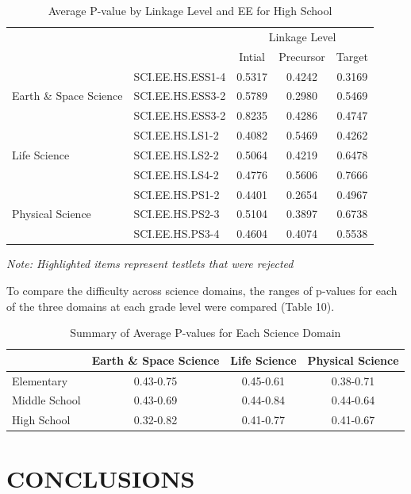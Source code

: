 \documentclass[11.5pt]{sig-alternate} %
\begin{document}
\begin{large}
\begin{table}[thp]
\caption{Average P-value by Linkage Level and EE for High School}
\begin{tabular}{llccc}
\hline
& & \multicolumn{3}{c}{Linkage Level} \\ \cline{3-5}
& & Intial & Precursor & Target \\ \hline
\multirow{3}{*}{Earth \& Space Science} & SCI.EE.HS.ESS1-4 & 0.5317 & 0.4242 & 0.3169 \\
 & SCI.EE.HS.ESS3-2 & 0.5789 & \cellcolor{yellow}0.2980 & 0.5469 \\
 & SCI.EE.HS.ESS3-2 & 0.8235 & 0.4286 & 0.4747 \\ \hline
\multirow{3}{*}{Life Science} & SCI.EE.HS.LS1-2 & 0.4082 & 0.5469 & 0.4262 \\
 & SCI.EE.HS.LS2-2 & 0.5064 & 0.4219 & 0.6478 \\
 & SCI.EE.HS.LS4-2 & 0.4776 & 0.5606 & 0.7666 \\ \hline
\multirow{3}{*}{Physical Science} & SCI.EE.HS.PS1-2 & 0.4401 & \cellcolor{yellow}0.2654 & 0.4967 \\
 & SCI.EE.HS.PS2-3 & 0.5104 & 0.3897 & 0.6738 \\
 & SCI.EE.HS.PS3-4 & 0.4604 & 0.4074 & 0.5538 \\ \hline
\end{tabular}
\textit{Note: Highlighted items represent testlets that were rejected}
\end{table}

To compare the difficulty across science domains, the ranges of p-values for each of the three domains at each grade level were compared (Table 10). 

\begin{table}[thp]
\caption{Summary of Average P-values for Each Science Domain}
\begin{tabular}{lccc}
\hline
 & \textbf{Earth \& Space Science} & \textbf{Life Science} & \textbf{Physical Science} \\ \hline
Elementary & 0.43-0.75 & 0.45-0.61 & 0.38-0.71 \\
Middle School & 0.43-0.69 & 0.44-0.84 & 0.44-0.64 \\
High School & 0.32-0.82 & 0.41-0.77 & 0.41-0.67 \\ \hline
\end{tabular}
\end{table}

\section*{CONCLUSIONS}


\end{large}
\end{document}
